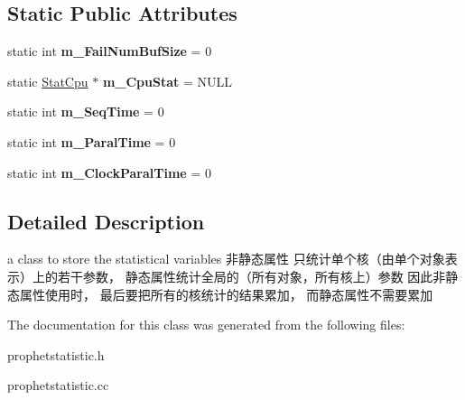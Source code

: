 \subsection*{Static Public Attributes}
\begin{DoxyCompactItemize}
\item 
\hypertarget{classProphetStat_1_1StatRecord_a2002cb849842096dd9724a5948a9fef3}{
static int {\bfseries m\_\-FailNumBufSize} = 0}
\label{classProphetStat_1_1StatRecord_a2002cb849842096dd9724a5948a9fef3}

\item 
\hypertarget{classProphetStat_1_1StatRecord_a877704fda335e3067af262a2b2e41e44}{
static \hyperlink{structProphetStat_1_1StatCpu}{StatCpu} $\ast$ {\bfseries m\_\-CpuStat} = NULL}
\label{classProphetStat_1_1StatRecord_a877704fda335e3067af262a2b2e41e44}

\item 
\hypertarget{classProphetStat_1_1StatRecord_a7ddc6930036810c1b24addc59f9cc0a4}{
static int {\bfseries m\_\-SeqTime} = 0}
\label{classProphetStat_1_1StatRecord_a7ddc6930036810c1b24addc59f9cc0a4}

\item 
\hypertarget{classProphetStat_1_1StatRecord_ab74d5acea0265b52037090c4c5e9416a}{
static int {\bfseries m\_\-ParalTime} = 0}
\label{classProphetStat_1_1StatRecord_ab74d5acea0265b52037090c4c5e9416a}

\item 
\hypertarget{classProphetStat_1_1StatRecord_a5ced35d9aadf20c7026fb0279fa36fd1}{
static int {\bfseries m\_\-ClockParalTime} = 0}
\label{classProphetStat_1_1StatRecord_a5ced35d9aadf20c7026fb0279fa36fd1}

\end{DoxyCompactItemize}


\subsection{Detailed Description}
a class to store the statistical variables 非静态属性 只统计单个核（由单个对象表示）上的若干参数， 静态属性统计全局的（所有对象，所有核上）参数 因此非静态属性使用时， 最后要把所有的核统计的结果累加， 而静态属性不需要累加 

The documentation for this class was generated from the following files:\begin{DoxyCompactItemize}
\item 
prophetstatistic.h\item 
prophetstatistic.cc\end{DoxyCompactItemize}
